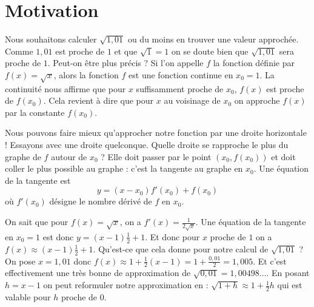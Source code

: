 \documentclass[class=report,crop=false]{standalone}
\begin{document}






\section*{Motivation}

Nous souhaitons calculer $\sqrt{1,01}$ ou du moins en trouver une valeur approchée.
Comme $1,01$ est proche de $1$ et que $\sqrt{1}=1$ on se doute bien que $\sqrt{1,01}$
sera proche de $1$. Peut-on être plus précis ?
Si l'on appelle $f$ la fonction définie par $f(x)=\sqrt{x}$, alors la fonction $f$ est une fonction
continue en $x_0=1$. La continuité nous affirme que pour $x$ suffisamment proche de $x_0$,
$f(x)$ est proche de $f(x_0)$. Cela revient à dire que pour $x$ au voisinage de $x_0$ on approche $f(x)$
par la constante $f(x_0)$.


Nous pouvons faire mieux qu'approcher notre fonction par une droite horizontale ! Essayons avec une droite
quelconque. Quelle droite se rapproche le plus du graphe de $f$ autour de $x_0$ ? Elle
doit passer par le point $(x_0,f(x_0))$ et doit \og coller \fg{}
le plus possible au graphe : c'est la tangente
au graphe en $x_0$.
Une équation de la tangente est
$$y = (x-x_0) f'(x_0) + f(x_0)$$
où $f'(x_0)$ désigne le nombre dérivé de $f$ en $x_0$.


On sait que pour $f(x)=\sqrt x$, on a $f'(x)=\frac{1}{2\sqrt x}$.
Une équation de la tangente en $x_0=1$ est donc $y=(x-1)\frac12+1$.
Et donc pour $x$ proche de $1$ on a $f(x) \approx (x-1)\frac12+1$.
Qu'est-ce que cela donne pour notre calcul de $\sqrt{1,01}$ ?
On pose $x=1,01$ donc $f(x) \approx 1+\frac12(x-1) = 1 + \frac{0,01}{2}=1,005$.
Et c'est effectivement une très bonne de approximation de $\sqrt{0,01}=1,00498\ldots$.
En posant $h=x-1$ on peut reformuler notre approximation en :
$\sqrt{1+h} \approx 1+\frac12h$ qui est valable pour $h$ proche de $0$.
\end{document}
